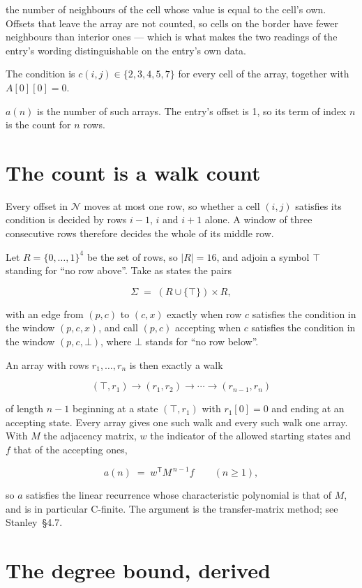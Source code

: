 \documentclass[11pt]{article}
\theoremstyle{definition}
\begin{document}
the number of neighbours of the cell whose value is equal to the cell's own. Offsets that leave the array are not counted, so cells on the border have fewer neighbours than interior ones --- which is what makes the two readings of the entry's wording distinguishable on the entry's own data.

The condition is $c(i,j) \in \{2, 3, 4, 5, 7\}$ for every cell of the array, together with $A[0][0]=0$.

$a(n)$ is the number of such arrays. The entry's offset is 1, so its term of index $n$ is the count for $n$ rows.

\section{The count is a walk count}

Every offset in $\mathcal{N}$ moves at most one row, so whether a cell $(i,j)$ satisfies its condition is decided by rows $i-1$, $i$ and $i+1$ alone. A window of three consecutive rows therefore decides the whole of its middle row.

Let $R = \{0,\dots,1\}^{4}$ be the set of rows, so $|R| = 16$, and adjoin a symbol $\top$ standing for ``no row above''. Take as states the pairs

\[\Sigma \;=\; (R \cup \{\top\}) \times R,\]

with an edge from $(p,c)$ to $(c,x)$ exactly when row $c$ satisfies the condition in the window $(p,c,x)$, and call $(p,c)$ accepting when $c$ satisfies the condition in the window $(p,c,\bot)$, where $\bot$ stands for ``no row below''.

An array with rows $r_1,\dots,r_n$ is then exactly a walk

\[(\top,r_1) \to (r_1,r_2) \to \cdots \to (r_{n-1},r_n)\]

of length $n-1$ beginning at a state $(\top,r_1)$ with $r_1[0]=0$ and ending at an accepting state. Every array gives one such walk and every such walk one array. With $M$ the adjacency matrix, $w$ the indicator of the allowed starting states and $f$ that of the accepting ones,

\[a(n) \;=\; w^{\mathsf T} M^{\,n-1} f \qquad (n \ge 1),\]

so $a$ satisfies the linear recurrence whose characteristic polynomial is that of $M$, and is in particular C-finite. The argument is the transfer-matrix method; see Stanley~\S4.7.

\section{The degree bound, derived}
\end{document}

